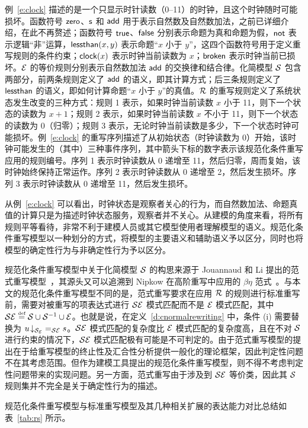 例~\ref{e:clock} 描述的是一个只显示时针读数（0--11）的时钟，且这个时钟随时可能损坏。函数符号 $\operatorname{\mathsf{zero}}$、$\operatorname{\mathsf{s}}$ 和 $\operatorname{\mathsf{add}}$ 用于表示自然数及自然数加法，之前已详细介绍，在此不再赘述；函数符号 $\operatorname{\mathsf{true}}$、$\operatorname{\mathsf{false}}$ 分别表示命题为真和命题为假，$\operatorname{\mathsf{not}}$ 表示逻辑“非”运算，$\operatorname{\mathsf{lessthan}}(x,y)$ 表示命题“$x$ 小于 $y$”，这四个函数符号用于定义重写规则的条件约束；$\operatorname{\mathsf{clock}}(x)$ 表示时钟当前读数为 $x$；$\operatorname{\mathsf{broken}}$ 表示时钟当前已损坏。$\mathcal{E}$ 的等价规则分别表示自然数加法 $\operatorname{\mathsf{add}}$ 的交换律和结合律。化简模型 $\mathcal{S}$ 包含两部分，前两条规则定义了 $\operatorname{\mathsf{add}}$ 的语义，即其计算方式；后三条规则定义了 $\operatorname{\mathsf{lessthan}}$ 的语义，即如何计算命题“$x$ 小于 $y$”的真值。$\mathcal{R}$ 的重写规则定义了系统状态发生改变的三种方式：规则 1 表示，如果时钟当前读数 $x$ 小于 11，则下一个状态的读数为 $x+1$；规则 2 表示，如果时钟当前读数 $x$ 不小于 11，则下一个状态的读数为 0（归零）；规则 3 表示，无论时钟当前读数是多少，下一个状态时钟可能损坏。例~\ref{e:clock} 的重写序列描述了从初始状态（时钟读数为 0）开始，该时钟可能发生的（其中）三种事件序列，其中箭头下标的数字表示该规范化条件重写应用的规则编号。序列 1 表示时钟读数从 0 递增至 11，然后归零，周而复始，该时钟始终保持正常运作。序列 2 表示时钟读数从 0 递增至 2，然后发生损坏。序列 3 表示时钟读数从 0 递增至 11，然后发生损坏。

从例~\ref{e:clock} 可以看出，时钟状态是观察者关心的行为，而自然数加法、命题真值的计算只是为描述时钟状态服务，观察者并不关心。从建模的角度来看，将所有规则平等看待，非常不利于建模人员或其它模型使用者理解模型的语义。规范化条件重写模型以一种划分的方式，将模型的主要语义和辅助语义予以区分，同时也将模型的确定性行为与非确定性行为予以区分。

规范化条件重写模型中关于化简模型 $\mathcal{S}$ 的构思来源于 Jouannaud 和 Li 提出的范式重写模型~\cite{DBLP:conf/csl/JouannaudL12}，其源头又可以追溯到 Nipkow 在高阶重写中应用的  $\beta\eta$ 范式~\cite{DBLP:conf/lics/Nipkow91}。与本文的规范化条件重写模型不同的是，范式重写要求在应用 $\mathcal{R}$ 的规则进行标准重写前，需要对被重写的项表达式进行 $\mathcal{S}\mathcal{E}$ 模式匹配而不是 $\mathcal{E}$ 模式匹配，其中 $\mathcal{S}\mathcal{E}\stackrel{\text{\tiny def}}{=}\mathcal{S}\cup\mathcal{S}^{-1}\cup\mathcal{E}$。也就是说，在定义~\ref{d:cnormalrewriting} 中，条件 (i) 需要替换为 ${{u}\!\downarrow_{\mathcal{S}_{\mathcal{E}}}} =_{\mathcal{S}\mathcal{E}} s$。$\mathcal{S}\mathcal{E}$ 模式匹配的复杂度比 $\mathcal{E}$ 模式匹配的复杂度高，且在不对 $\mathcal{S}$ 进行约束的情况下，$\mathcal{S}\mathcal{E}$ 模式匹配极有可能是不可判定的。由于范式重写模型的提出在于给重写模型的终止性及汇合性分析提供一般化的理论框架，因此判定性问题不在其考虑范围。但作为建模工具提出的规范化条件重写模型，则不得不考虑判定性问题带来的实现问题。另一方面，范式重写由于涉及到 $\mathcal{S}\mathcal{E}$ 等价类，因此其 $\mathcal{S}$ 规则集并不完全是关于确定性行为的描述。

规范化条件重写模型与标准重写模型及其几种相关扩展的表达能力对比总结如表~\ref{tab:rs} 所示。

